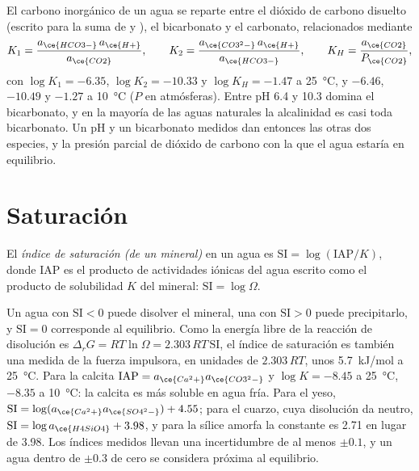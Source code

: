 El carbono inorgánico de un agua se reparte entre el dióxido de carbono disuelto
(escrito  para la suma de  y ), el bicarbonato y el
carbonato, relacionados mediante
\[
K_1 = \frac{a_{\ce{HCO3-}}\,a_{\ce{H+}}}{a_{\ce{CO2}}}, \qquad
K_2 = \frac{a_{\ce{CO3^2-}}\,a_{\ce{H+}}}{a_{\ce{HCO3-}}}, \qquad
K_H = \frac{a_{\ce{CO2}}}{P_{\ce{CO2}}},
\]
con $\log K_1 = -6.35$, $\log K_2 = -10.33$ y $\log K_H = -1.47$ a
\qty{25}{\celsius}, y $-6.46$, $-10.49$ y $-1.27$ a \qty{10}{\celsius}
($P$ en atmósferas). Entre pH 6.4 y 10.3 domina el bicarbonato, y en la mayoría
de las aguas naturales la alcalinidad es casi toda bicarbonato. Un pH y un
bicarbonato medidos dan entonces las otras dos especies, y la presión parcial de
dióxido de carbono con la que el agua estaría en equilibrio.

\section{Saturación}\label{sec:b3:water-rock-interaction:saturation}

\begin{definition}\label{def:b3:water-rock-interaction:si}
El \emph{índice de saturación (de un mineral)}
en un agua es $\mathrm{SI} = \log(\mathrm{IAP}/K)$, donde IAP es
el producto de actividades iónicas del agua escrito como el producto de solubilidad
$K$ del mineral: $\mathrm{SI} = \log\Omega$.
\end{definition}

Un agua con $\mathrm{SI} < 0$ puede disolver el mineral, una con
$\mathrm{SI} > 0$ puede precipitarlo, y $\mathrm{SI} = 0$ corresponde al equilibrio.
Como la energía libre de la reacción de disolución es $\Delta_r G = RT\ln\Omega
= 2.303\,RT\,\mathrm{SI}$, el índice de saturación es también una medida de la
fuerza impulsora, en unidades de $2.303\,RT$, unos \qty{5.7}{kJ/mol} a
\qty{25}{\celsius}. Para la calcita $\mathrm{IAP} = a_{\ce{Ca^2+}}
a_{\ce{CO3^2-}}$ y $\log K = -8.45$ a \qty{25}{\celsius}, $-8.35$ a
\qty{10}{\celsius}: la calcita es más soluble en agua fría. Para el yeso, $\mathrm{SI} = \log(a_{\ce{Ca^2+}}a_{\ce{SO4^2-}}) + 4.55$;
para el cuarzo, cuya disolución da  neutro, $\mathrm{SI} = \log
a_{\ce{H4SiO4}} + 3.98$, y para la sílice amorfa la constante es 2.71
en lugar de 3.98. Los índices medidos llevan una incertidumbre de al menos $\pm0.1$,
y un agua dentro de $\pm0.3$ de cero se considera próxima al equilibrio.

